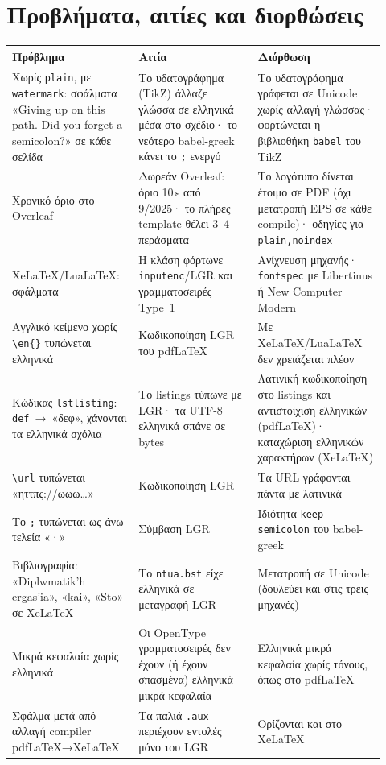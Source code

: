 \documentclass[a4paper,11pt]{article}
\begin{document}
\section{Προβλήματα, αιτίες και διορθώσεις}
\begin{longtable}{>{\raggedright}p{0.30\linewidth}>{\raggedright}p{0.30\linewidth}>{\raggedright\arraybackslash}p{0.32\linewidth}}
\toprule
\textbf{Πρόβλημα} & \textbf{Αιτία} & \textbf{Διόρθωση}\\
\midrule\endhead
Χωρίς \texttt{plain}, με \texttt{watermark}: σφάλματα «\foreignlanguage{english}{Giving up on this path. Did you forget a semicolon?}» σε κάθε σελίδα
& Το υδατογράφημα (TikZ) άλλαζε γλώσσα σε ελληνικά μέσα στο σχέδιο· το νεότερο babel-greek κάνει το \texttt{;} ενεργό
& Το υδατογράφημα γράφεται σε Unicode χωρίς αλλαγή γλώσσας· φορτώνεται η βιβλιοθήκη \texttt{babel} του TikZ\\
Χρονικό όριο στο Overleaf
& Δωρεάν Overleaf: όριο 10\,s από 9/2025· το πλήρες template θέλει 3–4 περάσματα
& Το λογότυπο δίνεται έτοιμο σε PDF (όχι μετατροπή EPS σε κάθε compile)· οδηγίες για \texttt{plain,noindex}\\
XeLaTeX/LuaLaTeX: \origxeerrors{} σφάλματα
& Η κλάση φόρτωνε \texttt{inputenc}/LGR και γραμματοσειρές Type~1
& Ανίχνευση μηχανής· \texttt{fontspec} με Libertinus ή New Computer Modern\\
Αγγλικό κείμενο χωρίς \verb|\en{}| τυπώνεται ελληνικά
& Κωδικοποίηση LGR του pdfLaTeX
& Με XeLaTeX/LuaLaTeX δεν χρειάζεται πλέον\\
Κώδικας \texttt{lstlisting}: \texttt{def}~→~«δεφ», χάνονται τα ελληνικά σχόλια
& Το listings τύπωνε με LGR· τα UTF-8 ελληνικά σπάνε σε bytes
& Λατινική κωδικοποίηση στο listings και αντιστοίχιση ελληνικών (pdfLaTeX)· καταχώριση ελληνικών χαρακτήρων (XeLaTeX)\\
\verb|\url| τυπώνεται «ηττπς://ωωω…»
& Κωδικοποίηση LGR
& Τα URL γράφονται πάντα με λατινικά\\
Το \texttt{;} τυπώνεται ως άνω τελεία «·»
& Σύμβαση LGR
& Ιδιότητα \texttt{keep-semicolon} του babel-greek\\
Βιβλιογραφία: «\foreignlanguage{english}{Diplwmatik'h ergas'ia}», «\foreignlanguage{english}{kai}», «\foreignlanguage{english}{Sto}» σε XeLaTeX
& Το \texttt{ntua.bst} είχε ελληνικά σε μεταγραφή LGR
& Μετατροπή σε Unicode (δουλεύει και στις τρεις μηχανές)\\
Μικρά κεφαλαία χωρίς ελληνικά
& Οι OpenType γραμματοσειρές δεν έχουν (ή έχουν σπασμένα) ελληνικά μικρά κεφαλαία
& Ελληνικά μικρά κεφαλαία χωρίς τόνους, όπως στο pdfLaTeX\\
Σφάλμα μετά από αλλαγή compiler pdfLaTeX→XeLaTeX
& Τα παλιά \texttt{.aux} περιέχουν εντολές μόνο του LGR
& Ορίζονται και στο XeLaTeX\\
\bottomrule
\end{longtable}
\end{document}
